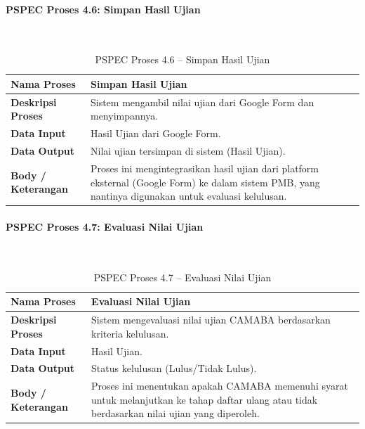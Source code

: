 \paragraph{PSPEC Proses 4.6: Simpan Hasil Ujian}~\\
\begin{longtable}{|p{}|p{}|}
	\caption{PSPEC Proses 4.6 -- Simpan Hasil Ujian}
	\label{table:3.pspec46}\\
	\hline
	\textbf{Nama Proses} & Simpan Hasil Ujian \\
	\hline
	\textbf{Deskripsi Proses} & Sistem mengambil nilai ujian dari Google Form dan menyimpannya. \\
	\hline
	\textbf{Data Input} & Hasil Ujian dari Google Form. \\
	\hline
	\textbf{Data Output} & Nilai ujian tersimpan di sistem (Hasil Ujian). \\
	\hline
	\textbf{Body / Keterangan} & Proses ini mengintegrasikan hasil ujian dari platform eksternal (Google Form) ke dalam sistem PMB, yang nantinya digunakan untuk evaluasi kelulusan. \\
	\hline
\end{longtable}


\paragraph{PSPEC Proses 4.7: Evaluasi Nilai Ujian}~\\
\begin{longtable}{|p{}|p{}|}
	\caption{PSPEC Proses 4.7 -- Evaluasi Nilai Ujian}
	\label{table:3.pspec47}\\
	\hline
	\textbf{Nama Proses} & Evaluasi Nilai Ujian \\
	\hline
	\textbf{Deskripsi Proses} & Sistem mengevaluasi nilai ujian CAMABA berdasarkan kriteria kelulusan. \\
	\hline
	\textbf{Data Input} & Hasil Ujian. \\
	\hline
	\textbf{Data Output} & Status kelulusan (Lulus/Tidak Lulus). \\
	\hline
	\textbf{Body / Keterangan} & Proses ini menentukan apakah CAMABA memenuhi syarat untuk melanjutkan ke tahap daftar ulang atau tidak berdasarkan nilai ujian yang diperoleh. \\
	\hline
\end{longtable}


